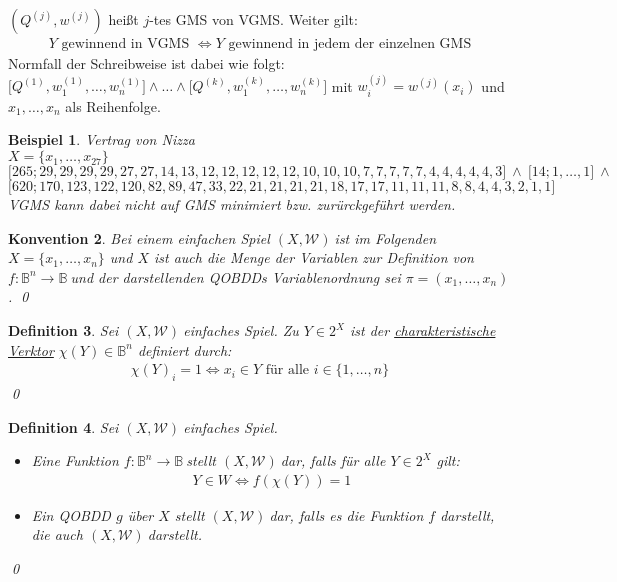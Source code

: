 \documentclass[ngerman]{scrartcl}
\theoremstyle{custom}
\newtheorem{mdef}{Definition} \numberwithin{mdef}{subsection}
\newtheorem{mex}[mdef]{Beispiel}
\newtheorem{mk}[mdef]{Konvention}
\newcommand{\0}{\mathbf{0}}
\newcommand{\1}{\mathbf{L}}
\newcommand{\bol}{\mathds{B}^n \rightarrow \mathds{B}}
\newcommand{\bolf}{$f: \bol~$}
\newcommand{\sg}{$(X,\mathcal{W})~$}
\begin{document}
$(Q^{(j)},w^{(j)})$ hei\ss t $j$-tes GMS von VGMS. Weiter gilt:
\begin{align*}
Y \text{ gewinnend in VGMS } \Leftrightarrow Y \text{ gewinnend in
  jedem der einzelnen GMS}
\end{align*}
Normfall der Schreibweise ist dabei wie folgt:\\
$\lbrack Q^{(1)},w^{(1)}_1,\dots, w^{(1)}_n \rbrack \wedge \dots
\wedge \lbrack Q^{(k)},w^{(k)}_1,\dots, w^{(k)}_n \rbrack$ mit
$w_i^{(j)}=w^{(j)}(x_i)$ und $x_1, \dots, x_n$ als Reihenfolge.

\begin{mex}\label{mex:415}
Vertrag von Nizza\\
$X = \{x_1, \dots, x_{27}\}$\\
$\lbrack 265; 29, 29, 29, 29, 27, 27, 14, 13, 12, 12, 12, 12, 12, 10,
10, 10, 7, 7, 7, 7, 7, 4, 4, 4, 4, 4, 3\rbrack ~\wedge~ \lbrack 14; 1,
\dots, 1 \rbrack ~\wedge$\\
$\lbrack 620; 170, 123, 122, 120, 82, 89, 47, 33, 22, 21, 21, 21, 21,
18, 17, 17, 11, 11, 11, 8, 8, 4, 4, 3, 2, 1, 1\rbrack$\\
VGMS kann dabei nicht auf GMS minimiert bzw. zur\"urckgef\"uhrt werden.
\end{mex}

\begin{mk}
Bei einem einfachen Spiel \sg ist im Folgenden $X = \{x_1, \dots, x_n\}$
und $X$ ist auch die Menge der Variablen zur Definition von \bolf und
der darstellenden QOBDDs Variablenordnung sei $\pi = (x_1, \dots, x_n)$.
\qed
\end{mk}

\begin{mdef}
Sei \sg einfaches Spiel. Zu $Y \in 2^X$ ist der
\underline{charakteristische Verktor} $\chi(Y) \in \mathds{B}^n$
definiert durch:
\begin{align*}
\chi(Y)_i =1 \Leftrightarrow x_i \in Y \text{ f\"ur alle } i \in \{1,
\dots, n\}
\end{align*}
\qed
\end{mdef}

\begin{mdef}
Sei \sg einfaches Spiel. 
\begin{itemize}
\item[(1)] Eine Funktion \bolf stellt \sg dar, falls f\"ur alle $Y \in
  2^X$ gilt:
\begin{align*}
Y \in W \Leftrightarrow f(\chi(Y)) = 1
\end{align*}
\item[(2)] Ein QOBDD $g$ \"uber $X$ stellt \sg dar, falls es die
  Funktion $f$ darstellt, die auch \sg darstellt.
\end{itemize}
\qed
\end{mdef}
\end{document}
